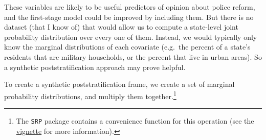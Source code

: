 \documentclass[
]{article}
\begin{document}
These variables are likely to be useful predictors of opinion about
police reform, and the first-stage model could be improved by including
them. But there is no dataset (that I know of) that would allow us to
compute a state-level joint probability distribution over every one of
them. Instead, we would typically only know the marginal distributions
of each covariate (e.g.~the percent of a state's residents that are
military households, or the percent that live in urban areas). So a
synthetic poststratification approach may prove helpful.

To create a synthetic poststratification frame, we create a set of
marginal probability distributions, and multiply them
together.\footnote{The \texttt{SRP} package contains a convenience
  function for this operation (see the
  \href{https://joeornstein.github.io/software/SRP/}{vignette} for more
  information).}
\end{document}
